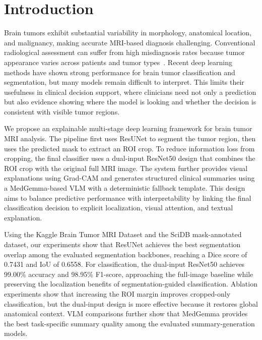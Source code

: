 \section{Introduction}

Brain tumors exhibit substantial variability in morphology, anatomical location, and malignancy, making accurate MRI-based diagnosis challenging. Conventional radiological assessment can suffer from high misdiagnosis rates because tumor appearance varies across patients and tumor types~\cite{yan2016mri}. Recent deep learning methods have shown strong performance for brain tumor classification and segmentation, but many models remain difficult to interpret. This limits their usefulness in clinical decision support, where clinicians need not only a prediction but also evidence showing where the model is looking and whether the decision is consistent with visible tumor regions.

We propose an explainable multi-stage deep learning framework for brain tumor MRI analysis. The pipeline first uses ResUNet to segment the tumor region, then uses the predicted mask to extract an ROI crop. To reduce information loss from cropping, the final classifier uses a dual-input ResNet50 design that combines the ROI crop with the original full MRI image. The system further provides visual explanations using Grad-CAM and generates structured clinical summaries using a MedGemma-based VLM with a deterministic fallback template. This design aims to balance predictive performance with interpretability by linking the final classification decision to explicit localization, visual attention, and textual explanation.

Using the Kaggle Brain Tumor MRI Dataset and the SciDB mask-annotated dataset, our experiments show that ResUNet achieves the best segmentation overlap among the evaluated segmentation backbones, reaching a Dice score of 0.7431 and IoU of 0.6558. For classification, the dual-input ResNet50 achieves 99.00\% accuracy and 98.95\% F1-score, approaching the full-image baseline while preserving the localization benefits of segmentation-guided classification. Ablation experiments show that increasing the ROI margin improves cropped-only classification, but the dual-input design is more effective because it restores global anatomical context. VLM comparisons further show that MedGemma provides the best task-specific summary quality among the evaluated summary-generation models.